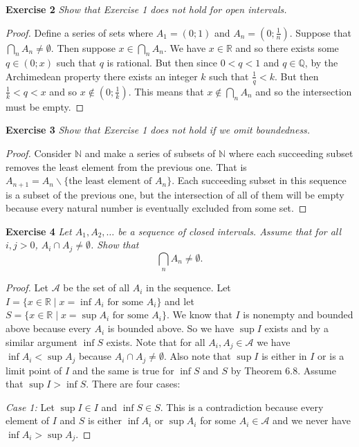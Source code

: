 \documentclass{article}
\begin{document}
\begin{flushleft}
\textbf{Exercise 2}
\textsl{Show that Exercise 1 does not hold for open intervals.}
\begin{proof}
Define a series of sets where $A_1=(0;1)$ and $A_n=(0;\frac{1}{n})$. Suppose that $\bigcap_n A_n \neq \emptyset$. Then suppose $x \in \bigcap_n A_n$. We have $x \in \mathbb{R}$ and so there exists some $q \in (0;x)$ such that $q$ is rational. But then since $0<q<1$ and $q \in \mathbb{Q}$, by the Archimedean property there exists an integer $k$ such that $\frac{1}{q}<k$. But then $\frac{1}{k}<q<x$ and so $x \notin (0;\frac{1}{k})$. This means that $x \notin \bigcap_n A_n$ and so the intersection must be empty.
\end{proof}

\textbf{Exercise 3}
\textsl{Show that Exercise 1 does not hold if we omit boundedness.}
\begin{proof}
Consider $\mathbb{N}$ and make a series of subsets of $\mathbb{N}$ where each succeeding subset removes the least element from the previous one. That is $A_{n+1}=A_n \backslash \{\text{the least element of $A_n$}\}$. Each succeeding subset in this sequence is a subset of the previous one, but the intersection of all of them will be empty because every natural number is eventually excluded from some set.
\end{proof}

\textbf{Exercise 4}
\textsl{Let $A_1, A_2, \dots$ be a sequence of closed intervals. Assume that for all $i,j>0$, $A_i \cap A_j \neq \emptyset$. Show that
\[
\bigcap_n A_n \neq \emptyset.
\]}
\begin{proof}
Let $\mathcal{A}$ be the set of all $A_i$ in the sequence. Let $I=\{x \in \mathbb{R} \mid x=\inf A_i \text{ for some $A_i$}\}$ and let $S=\{x \in \mathbb{R} \mid x=\sup A_i \text{ for some $A_i$}\}$. We know that $I$ is nonempty and bounded above because every $A_i$ is bounded above. So we have $\sup I$ exists and by a similar argument $\inf S$ exists. Note that for all $A_i,A_j \in \mathcal{A}$ we have $\inf A_i < \sup A_j$ because $A_i \cap A_j \neq \emptyset$. Also note that $\sup I$ is either in $I$ or is a limit point of $I$ and the same is true for $\inf S$ and $S$ by Theorem 6.8. Assume that $\sup I > \inf S$. There are four cases:\newline

\textit{Case 1:} Let $\sup I \in I$ and $\inf S \in S$. This is a contradiction because every element of $I$ and $S$ is either $\inf A_i$ or $\sup A_i$ for some $A_i \in \mathcal{A}$ and we never have $\inf A_i > \sup A_j$.\newline


\end{proof}
\end{flushleft}
\end{document}

